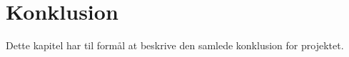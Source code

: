 \chapter{Konklusion}
Dette kapitel har til formål at beskrive den samlede 
konklusion for projektet. 

